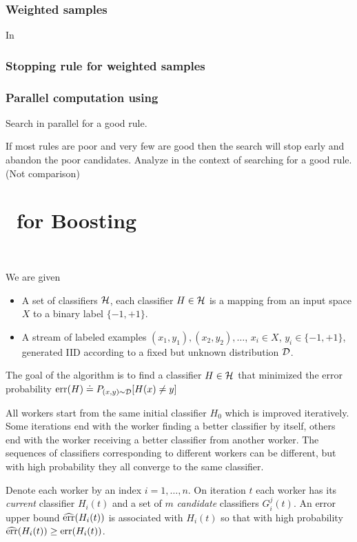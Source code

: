 \subsubsection*{Weighted samples}

In 

\subsubsection*{Stopping rule for weighted samples}

\subsubsection*{Parallel computation using \tmsn}

Search in parallel for a good rule.

If most rules are poor and very few are good then the search will stop
early and abandon the poor candidates. Analyze in the context of
searching for a good rule. (Not comparison)

\section{\tmsn\ for Boosting}~\label{sec:boost}

We are given
\newcommand{\cD}{{\cal D}}
\begin{itemize}
\item A set of classifiers ${\cal H}$, each classifier $H \in
  {\cal H}$ is a mapping from an input space $X$ to a binary label $\{-1,+1\}$.
\item A stream of labeled examples $(x_1,y_1),(x_2,y_2),\ldots$, $x_i
  \in X$, $y_i \in \{-1,+1\}$, generated IID according to a fixed but
  unknown distribution $\cD$.
\end{itemize}

The goal of the algorithm is to find a classifier $H \in
{\cal H}$ that minimized the error probability $\err(H)\doteq
P_{(x,y) \sim \cD}[H(x) \neq y]$

All workers start from the same initial classifier $H_0$ which is
improved iteratively. Some iterations end with the worker finding a
better classifier by itself, others end with the worker receiving a
better classifier from another worker. The sequences of classifiers
corresponding to different workers can be different, but with high
probability they all converge to the same classifier.

Denote each worker by an index $i=1,\ldots,n$. On iteration $t$
each worker has its {\em current} classifier  $H_i(t)$ and a set of $m$
{\em candidate} classifiers $G_i^j(t)$. An error upper bound
$\widehat{\mbox{err}}(H_i(t))$ is associated with $H_i(t)$ so that with high
probability $\widehat{\mbox{err}}(H_i(t)) \geq \mbox{err}(H_i(t))$.

